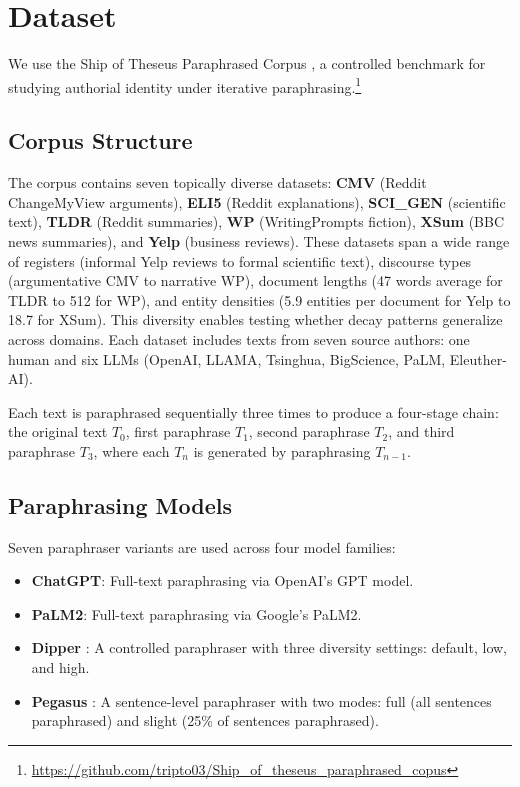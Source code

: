 \section{Dataset}

We use the Ship of Theseus Paraphrased Corpus \cite{tripto2024ship}, a controlled benchmark for studying authorial identity under iterative paraphrasing.\footnote{\url{https://github.com/tripto03/Ship_of_theseus_paraphrased_copus}}

\subsection{Corpus Structure}

The corpus contains seven topically diverse datasets: \textbf{CMV} (Reddit ChangeMyView arguments), \textbf{ELI5} (Reddit explanations), \textbf{SCI\_GEN} (scientific text), \textbf{TLDR} (Reddit summaries), \textbf{WP} (WritingPrompts fiction), \textbf{XSum} (BBC news summaries), and \textbf{Yelp} (business reviews). These datasets span a wide range of registers (informal Yelp reviews to formal scientific text), discourse types (argumentative CMV to narrative WP), document lengths (47 words average for TLDR to 512 for WP), and entity densities (5.9 entities per document for Yelp to 18.7 for XSum). This diversity enables testing whether decay patterns generalize across domains. Each dataset includes texts from seven source authors: one human and six LLMs (OpenAI, LLAMA, Tsinghua, BigScience, PaLM, Eleuther-AI).

Each text is paraphrased sequentially three times to produce a four-stage chain: the original text $T_0$, first paraphrase $T_1$, second paraphrase $T_2$, and third paraphrase $T_3$, where each $T_n$ is generated by paraphrasing $T_{n-1}$.

\subsection{Paraphrasing Models}

Seven paraphraser variants are used across four model families:

\begin{itemize}
    \item \textbf{ChatGPT}: Full-text paraphrasing via OpenAI's GPT model.
    \item \textbf{PaLM2}: Full-text paraphrasing via Google's PaLM2.
    \item \textbf{Dipper} \cite{krishna2023dipper}: A controlled paraphraser with three diversity settings: default, low, and high.
    \item \textbf{Pegasus} \cite{zhang2020pegasus}: A sentence-level paraphraser with two modes: full (all sentences paraphrased) and slight (25\% of sentences paraphrased).
\end{itemize}

